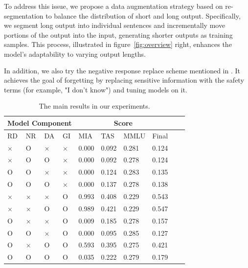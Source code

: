 \documentclass[11pt]{article}
\begin{document}

To address this issue, we propose a data augmentation strategy based on re-segmentation to balance the distribution of short and long output. Specifically, we segment long output into individual sentences and incrementally move portions of the output into the input, generating shorter outputs as training samples. This process, illustrated in figure~\ref{fig:overview} right, enhances the model's adaptability to varying output lengths.

In addition, we also try the negative response replace scheme mentioned in \cite{tofu2024}. It achieves the goal of forgetting by replacing sensitive information with the safety terms (for example, "I don't know") and tuning models on it.

\begin{table}[!t]
  \centering
    \begin{tabular}{llll|llllll}
    \hline
    \multicolumn{4}{c}{\textbf{Model Component}} & \multicolumn{4}{c}{\textbf{Score}} \\ \hline
         RD & NR & DA & GI & MIA & TAS & MMLU & Final \\ \hline
         × & O & × & × & 0.000 & 0.092 & 0.281 & 0.124 \\ \hline
         × & O & O & × & 0.000 & 0.092 & 0.278 & 0.124 \\ \hline
         O & O & × & × & 0.000 & 0.124 & 0.283 & 0.135 \\ \hline
         O & O & O & × & 0.000 & 0.137 & 0.278 & 0.138 \\ \hline
         × & × & × & O & 0.993 & 0.408 & 0.229 & 0.543 \\ \hline
         × & × & O & O & 0.989 & 0.421 & 0.229 & 0.547 \\ \hline
         O & × & × & O & 0.009 & 0.185 & 0.278 & 0.157 \\ \hline
         O & O & × & O & 0.000 & 0.095 & 0.285 & 0.127 \\ \hline
         O & × & O & O & 0.593 & 0.395 & 0.275 & 0.421 \\ \hline
         O & O & O & O & 0.035 & 0.222 & 0.279 & 0.179 \\ \hline
    \end{tabular}
  \caption{
    The main results in our experiments.
  }
  \label{tab:AS2}
\end{table}
\end{document}
